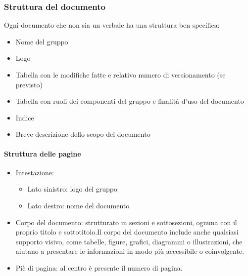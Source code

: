 \documentclass[12pt]{article}
\begin{document}
\subsubsection{Struttura del documento}
Ogni documento che non sia un verbale ha una struttura ben specifica:
\begin{itemize}
    \item Nome del gruppo
    \item Logo 
    \item Tabella con le modifiche fatte e relativo numero di versionamento (se previsto)
    \item Tabella con ruoli dei componenti del gruppo e finalità d'uso del documento
    \item Indice
    \item Breve descrizione dello scopo del documento
\end{itemize}

\paragraph{Struttura delle pagine}
\begin{itemize}
	\item Intestazione:
		\begin{itemize}
			\item Lato sinistro: logo del gruppo
			\item Lato destro: nome del documento
		\end{itemize}
	\item Corpo del documento:  strutturato in sezioni e sottosezioni, ognuna con il proprio titolo e sottotitolo.Il corpo del documento include anche qualsiasi supporto visivo, come tabelle, figure, grafici, 	diagrammi o illustrazioni, che aiutano a presentare le informazioni in modo più accessibile o coinvolgente.
	\item Piè di pagina: al centro è presente il numero di pagina.
\end{itemize}
\end{document}

